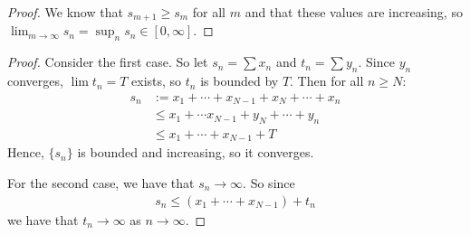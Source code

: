 \documentclass{report}
\begin{document}
\begin{proof}
    We know that $s_{m+1} \geq s_m$ for all $m$ and that these values are increasing, so $\lim_{m \to \infty} s_n = \sup_{n}s_n \in [0, \infty]$. 
\end{proof}
\begin{proof}
    Consider the first case. So let $s_n = \sum x_n$ and $t_n = \sum y_n$. Since $y_n$ converges, $\lim t_n = T$ exists, so $t_n$ is bounded by $T$. Then for all $n \geq N$:
    \begin{align*}
        s_n &:= x_1 + \cdots + x_{N-1} + x_N + \cdots + x_n \\
        &\leq x_1 + \cdots x_{N-1} + y_N + \cdots + y_n \\
        &\leq x_1 + \cdots + x_{N-1} + T
    \end{align*}
    Hence, $\{s_n\}$ is bounded and increasing, so it converges.

    For the second case, we have that $s_n \to \infty$. So since \begin{align*}
        s_n \leq (x_1  +\cdots + x_{N-1}) + t_n
    \end{align*}
    we have that $t_n \to \infty$ as $n \to \infty$. 
\end{proof}
\end{document}
